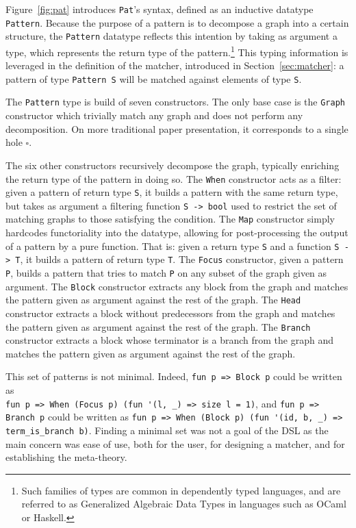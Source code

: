 \documentclass[11pt]{article}
\newcommand{\inlinecoq}[1]{\mbox{\lstinline[style=customcoq,columns=fixed,basewidth=.48em]{#1}}}
\newcommand{\ilc}[1]{\inlinecoq{#1}}
\newcommand{\pat}{\texttt{Pat}\xspace}
\begin{document}
Figure~\ref{fig:pat} introduces \pat{}'s syntax, defined as an inductive datatype \ilc{Pattern}.
Because the purpose of a pattern is to decompose a graph into a certain structure, the \ilc{Pattern} datatype reflects this intention by taking as argument a type, which represents the return type of the pattern.\footnote{Such families of types are common in dependently typed languages, and are referred to as Generalized Algebraic Data Types in languages such as OCaml or Haskell.}
This typing information is leveraged in the definition of the matcher, introduced in Section~\ref{sec:matcher}: a pattern of type \ilc{Pattern S} will be matched against elements of type \ilc{S}.

The \ilc{Pattern} type is build of seven constructors. The only base case is the \ilc{Graph} constructor which trivially match any graph and does not perform any decomposition. On more traditional paper presentation, it corresponds to a single hole $\square$.

The six other constructors recursively decompose the graph, typically enriching the return type of the pattern in doing so. 
The \ilc{When} constructor acts as a filter:
given a pattern of return type \ilc{S}, it builds a pattern with the same return type, but takes as argument a filtering function \ilc{S -> bool} used to restrict the set of matching graphs to those satisfying the condition.
The \ilc{Map} constructor simply hardcodes functoriality into the datatype, allowing for post-processing the output of a pattern by a pure function. That is: given a return type \ilc{S} and a function \ilc{S -> T}, it builds a pattern of return type \ilc{T}.
The \ilc{Focus} constructor, given a pattern \ilc{P}, builds a pattern that tries to match \ilc{P} on any subset of the graph given as argument.
The \ilc{Block} constructor extracts any block from the graph and matches the pattern given as argument against the rest of the graph.
The \ilc{Head} constructor extracts a block without predecessors from the graph and matches the pattern given as argument against the rest of the graph.
The \ilc{Branch} constructor extracts a block whose terminator is a branch from the graph and matches the pattern given as argument against the rest of the graph.

This set of patterns is not minimal. Indeed, \ilc{fun p => Block p} could be written as\\\ilc{fun p => When (Focus p) (fun '(l, _) => size l = 1)}, and \ilc{fun p => Branch p} could be written as \ilc{fun p => When (Block p) (fun '(id, b, _) => term_is_branch b)}. Finding a minimal set was not a goal of the DSL as the main concern was ease of use, both for the user, for designing a matcher, and for establishing the meta-theory. 
\end{document}
